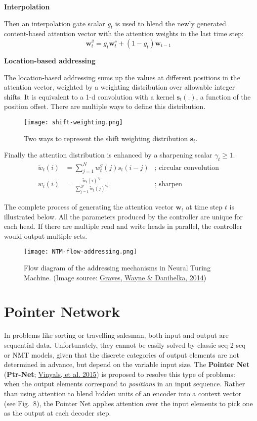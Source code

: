 \documentclass[12pt]{article}
\begin{document}
\textbf{Interpolation}

Then an interpolation gate scalar $g_t$ is used to blend the newly generated content-based attention vector with the attention weights in the last time step:
\[
\mathbf{w}_t^g = g_t \mathbf{w}_t^c + (1 - g_t) \mathbf{w}_{t-1} 
\]

\textbf{Location-based addressing}

The location-based addressing sums up the values at different positions in the attention vector, weighted by a weighting distribution over allowable integer shifts. It is equivalent to a 1-d convolution with a kernel $\mathbf{s}_t(.)$, a function of the position offset. There are multiple ways to define this distribution.

\begin{figure}[H]
    \centering
    \texttt{[image: shift-weighting.png]}
    \caption{Two ways to represent the shift weighting distribution $\mathbf{s}_t$.}
\end{figure}

Finally the attention distribution is enhanced by a sharpening scalar $\gamma_t \geq 1$.
\[
\begin{aligned}
\tilde{w}_t(i) &= \sum_{j=1}^N w_t^g(j) s_t(i-j) & \scriptstyle{\text{; circular convolution}}\\
w_t(i) &= \frac{\tilde{w}_t(i)^{\gamma_t}}{\sum_{j=1}^N \tilde{w}_t(j)^{\gamma_t}} & \scriptstyle{\text{; sharpen}}
\end{aligned}
\]

The complete process of generating the attention vector $\mathbf{w}_t$ at time step $t$ is illustrated below. All the parameters produced by the controller are unique for each head. If there are multiple read and write heads in parallel, the controller would output multiple sets.

\begin{figure}[H]
    \centering
    \texttt{[image: NTM-flow-addressing.png]}
    \caption{Flow diagram of the addressing mechanisms in Neural Turing Machine. (Image source: \href{https://arxiv.org/abs/1410.5401}{Graves, Wayne \& Danihelka, 2014})}
\end{figure}

\section{Pointer Network}
\label{pointer-network}
In problems like sorting or travelling salesman, both input and output are sequential data. Unfortunately, they cannot be easily solved by classic seq-2-seq or NMT models, given that the discrete categories of output elements are not determined in advance, but depend on the variable input size. The \textbf{Pointer Net} (\textbf{Ptr-Net}; \href{https://arxiv.org/abs/1506.03134}{Vinyals, et al. 2015}) is proposed to resolve this type of problems: when the output elements correspond to \emph{positions} in an input sequence. Rather than using attention to blend hidden units of an encoder into a context vector (see Fig.~8), the Pointer Net applies attention over the input elements to pick one as the output at each decoder step.
\end{document}
